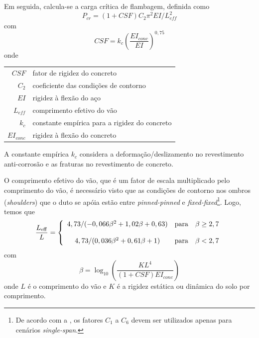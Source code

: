 Em seguida, calcula-se a carga crítica de flambagem, definida como
\begin{equation}
\label{eq:jdsn-Pcr}
P_\mathit{cr} = (1 + \mathit{CSF}) C_2\pi^2 \mathit{EI}/L_\mathit{eff}^2
\end{equation}
com
\begin{equation}
\label{eq:jdsn-CSF}
\mathit{CSF} = k_c  \left(\frac{\mathit{EI}_\mathit{conc}}{\mathit{EI}}\right)^{0,75}
\end{equation}
onde

\begin{tabular}{rl}
	$\mathit{CSF}$               & fator de rigidez do concreto\\
	$C_2$                        & coeficiente das condições de contorno\\
	$\mathit{EI}$                & rigidez à flexão do aço\\
	$L_\mathit{eff}$             & comprimento efetivo do vão\\
	$k_c$                        & constante empírica para a rigidez do concreto\\
	$\mathit{EI}_\mathit{conc}$  & rigidez à flexão do concreto
\end{tabular}

A constante empírica $k_c$ considera a deformação/deslizamento no revestimento anti-corrosão e as fraturas no revestimento de concreto.

O comprimento efetivo do vão, que é um fator de escala multiplicado pelo comprimento do vão, é necessário visto que as condições de contorno nos ombros (\textit{shoulders}) que o duto se apóia estão entre \textit{pinned-pinned} e \textit{fixed-fixed}\footnote{De acordo com a , os fatores $C_1$ a $C_6$ devem ser utilizados apenas para cenários \textit{single-span}.}.
Logo, temos que
\begin{equation}
\label{eq:jdsn-LeffL}
\frac{L_\mathrm{eff}}{L} =
\left\{
\begin{array}{c c c}
	4,73 / (-0,066 \beta^2 + 1,02 \beta + 0,63)   & \mathrm{para} & \beta \geq 2,7 \\
	\\
	4,73 / (0,036 \beta^2 + 0,61 \beta + 1)       & \mathrm{para} & \beta <    2,7
\end{array}
\right.
\end{equation}
com
\begin{equation}
\label{eq:jdsn-beta}
\beta = \log_{10}\left( \frac{K L^4}{(1 + \mathit{CSF})\mathit{EI}_\mathit{conc}} \right)
\end{equation}
onde $L$ é o comprimento do vão e $K$ é a rigidez estática ou dinâmica do solo por comprimento.

